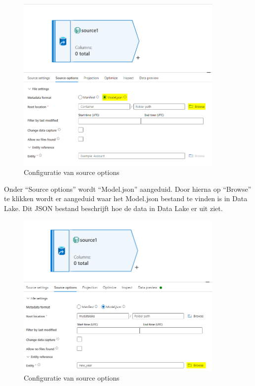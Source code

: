 \begin{figure}[H]
    \centering
    \includegraphics[width=0.9\textwidth]{./graphics/adf/source_table_4_specific.png}
    \caption{Configuratie van source options}
\end{figure}

Onder ``Source options'' wordt ``Model.json'' aangeduid. Door hierna op ``Browse'' te klikken wordt er aangeduid waar het Model.json bestand te vinden is in Data Lake. Dit JSON bestand beschrijft hoe de data in Data Lake er uit ziet.

\begin{figure}[H]
    \centering
    \includegraphics[width=0.9\textwidth]{./graphics/adf/source_table_5_specific.png}
    \caption{Configuratie van source options}
\end{figure}

